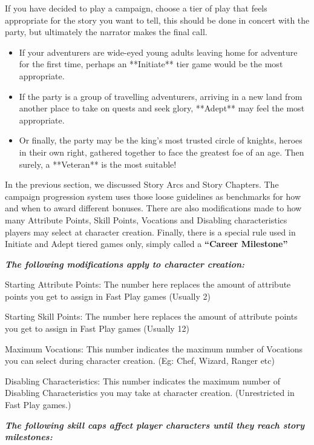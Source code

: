 If you have decided to play a campaign, choose a tier of play that feels appropriate for the story you want to tell, this should be done in concert with the party, but ultimately the narrator makes the final call.

\begin{itemize}
    \item If your adventurers are wide-eyed young adults leaving home for adventure for the first time, perhaps an **Initiate** tier game would be the most appropriate.
    \item If the party is a group of travelling adventurers, arriving in a new land from another place to take on quests and seek glory, **Adept** may feel the most appropriate.
    \item Or finally, the party may be the king's most trusted circle of knights, heroes in their own right, gathered together to face the greatest foe of an age. Then surely, a **Veteran** is the most suitable!
\end{itemize}

In the previous section, we discussed Story Arcs and Story Chapters. The campaign progression system uses those loose guidelines as benchmarks for how and when to award different bonuses. There are also modifications made to how many Attribute Points, Skill Points, Vocations and Disabling characteristics players may select at character creation. Finally, there is a special rule used in Initiate and Adept tiered games only, simply called a \textbf{“Career Milestone”}

\textbf{\textit{The following modifications apply to character creation:}}

\begin{displayquote}
    Starting Attribute Points: The number here replaces the amount of attribute points you get to assign in Fast Play games (Usually 2)

    Starting Skill Points: The number here replaces the amount of attribute points you get to assign in Fast Play games (Usually 12)

    Maximum Vocations: This number indicates the maximum number of Vocations you can select during character creation. (Eg: Chef, Wizard, Ranger etc)

    Disabling Characteristics: This number indicates the maximum number of Disabling Characteristics you may take at character creation. (Unrestricted in Fast Play games.)
\end{displayquote}

\textbf{\textit{The following skill caps affect player characters until they reach story milestones:}}

